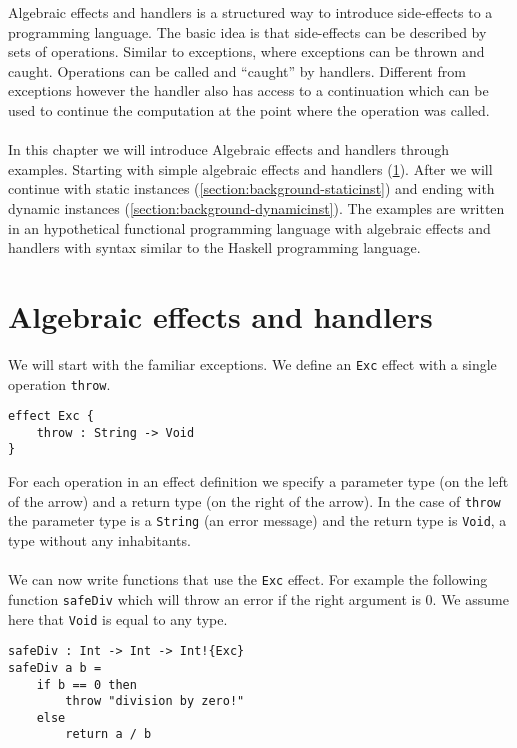{
\newcommand\ident[1]{\texttt{#1}}

Algebraic effects and handlers is a structured way to introduce side-effects to a programming language.
The basic idea is that side-effects can be described by sets of operations.
Similar to exceptions, where exceptions can be thrown and caught.
Operations can be called and ``caught'' by handlers.
Different from exceptions however the handler also has access to a continuation which can be used to continue the computation at the point where the operation was called.
\\\\
In this chapter we will introduce Algebraic effects and handlers through examples.
Starting with simple algebraic effects and handlers (\cref{section:background-algeff}). After we will continue with static instances (\cref{section:background-staticinst}) and ending with dynamic instances (\cref{section:background-dynamicinst}). The examples are written in an hypothetical functional programming language with algebraic effects and handlers with syntax similar to the Haskell programming language.

\section{Algebraic effects and handlers} \label{section:background-algeff}
We will start with the familiar exceptions. We define an \ident{Exc} effect with a single operation \ident{throw}.

\begin{verbatim}
effect Exc {
	throw : String -> Void
}
\end{verbatim}

For each operation in an effect definition we specify a parameter type (on the left of the arrow) and a return type (on the right of the arrow). In the case of \ident{throw} the parameter type is a \ident{String} (an error message) and the return type is \ident{Void}, a type without any inhabitants.
\\\\
We can now write functions that use the \ident{Exc} effect.
For example the following function \ident{safeDiv} which will throw an error if the right argument is $0$.
We assume here that \ident{Void} is equal to any type.

\begin{verbatim}
safeDiv : Int -> Int -> Int!{Exc}
safeDiv a b =
	if b == 0 then
		throw "division by zero!"
	else
		return a / b
\end{verbatim}

}
